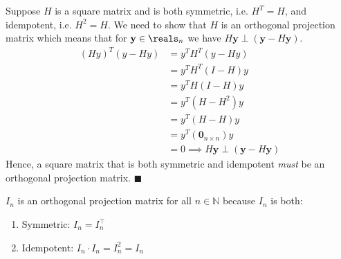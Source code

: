 \documentclass[12pt]{article}
\begin{document}
\begin{enumerate}

\begin{tcolorbox}[colback = white, sharp corners]
Suppose $H$ is a square matrix and is both symmetric, i.e. $H^T = H$, and idempotent, i.e. $H^2 = H$. We need to show that $H$ is an orthogonal projection matrix which means that for $\mathbf{y} \in \reals_n$ we have $H\mathbf{y} \perp (\mathbf{y} - H\mathbf{y})$. 
\begin{align*}
(Hy)^T(y - Hy) &= y^T H^T(y - Hy)\\
&= y^T H^T(I-H)y \\
&= y^T H(I-H)y\\
&= y^T(H - H^2)y \\
&= y^T(H - H)y \\
&= y^T(\mathbf{0}_{n \times n})y \\
&= 0 \implies H\mathbf{y} \perp (\mathbf{y} - H\mathbf{y})
\end{align*} 
Hence, a square matrix that is both symmetric and idempotent \emph{must} be an orthogonal projection matrix. \quad $\blacksquare$
\end{tcolorbox}


\begin{tcolorbox}[colback = white, sharp corners]

$I_n$ is an orthogonal projection matrix for all $n \in \mathbb{N}$ because $I_n$ is both:

\begin{enumerate}
\item[1)] Symmetric: $I_n = I_n^\top$
\item[2)] Idempotent: $I_n \cdot I_n = I_n^2 = I_n$
\end{enumerate}

\end{tcolorbox}

\newpage


\end{enumerate}
\end{document}
